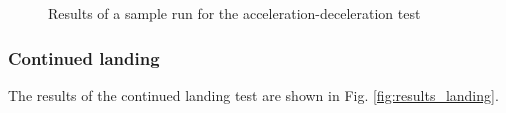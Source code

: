 \begin{figure}[htb]
    \centering
    \caption{Results of a sample run for the acceleration-deceleration test}
    \label{fig:results_acceldecel}
\end{figure}


\subsubsection{Continued landing}
The results of the continued landing test are shown in Fig. \ref{fig:results_landing}. 

